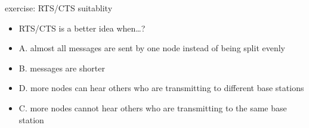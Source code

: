 \begin{frame}{exercise: RTS/CTS suitablity}
    \begin{itemize}
    \item RTS/CTS is a better idea when\ldots?
    \item A. almost all messages are sent by one node instead of being split evenly
    \item B. messages are shorter 
    \item D. more nodes can hear others who are transmitting to different base stations
    \item C. more nodes cannot hear others who are transmitting to the same base station
    \end{itemize}
\end{frame}
